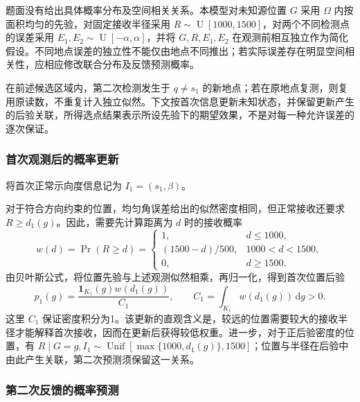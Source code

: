 \documentclass[UTF8,a4paper,zihao=-4,fontset=none]{ctexart}
\begin{document}
题面没有给出具体概率分布及空间相关关系。本模型对未知源位置 \(G\) 采用 \(\Omega\) 内按面积均匀的先验，对固定接收半径采用 \(R\sim\operatorname{U}[1000,1500]\)，对两个不同检测点的误差采用 \(E_1,E_2\sim\operatorname{U}[-\alpha,\alpha]\)，并将 \(G,R,E_1,E_2\) 在观测前相互独立作为简化假设。不同地点误差的独立性不能仅由地点不同推出；若实际误差存在明显空间相关性，应相应修改联合分布及反馈预测概率。

在前述候选区域内，第二次检测发生于 \(q\ne s_1\) 的新地点；若在原地点复测，则复用原读数，不重复计入独立似然。下文按首次信息更新未知状态，并保留更新产生的后验关联，所得选点结果表示所设先验下的期望效果，不是对每一种允许误差的逐次保证。

\subsubsection{首次观测后的概率更新}

将首次正常示向度信息记为 \(I_1=(s_1,\beta)\)。

对于符合方向约束的位置，均匀角误差给出的似然密度相同，但正常接收还要求 \(R\ge d_1(g)\)。因此，需要先计算距离为 \(d\) 时的接收概率
\begin{equation}
 w(d)=\Pr(R\ge d)=
 \begin{cases}
 1,&d\le1000,\\
 (1500-d)/500,&1000<d<1500,\\
 0,&d\ge1500.
 \end{cases}
\label{eq:q2-pair-weight}
\end{equation}
由贝叶斯公式，将位置先验与上述观测似然相乘，再归一化，得到首次位置后验
\begin{equation}
 p_1(g)=\frac{\mathbf1_{K_1}(g)w(d_1(g))}{C_1},
 \qquad C_1=\int_{K_1}w(d_1(g))\,\mathrm dg>0.
\label{eq:q2-pair-posterior}
\end{equation}
这里 \(C_1\) 保证密度积分为1。该更新的直观含义是，较远的位置需要较大的接收半径才能解释首次接收，因而在更新后获得较低权重。进一步，对于正后验密度的位置，有 \(R\mid G=g,I_1\sim\operatorname{Unif}[\max\{1000,d_1(g)\},1500]\)；位置与半径在后验中由此产生关联，第二次预测须保留这一关系。

\subsubsection{第二次反馈的概率预测}
\end{document}
